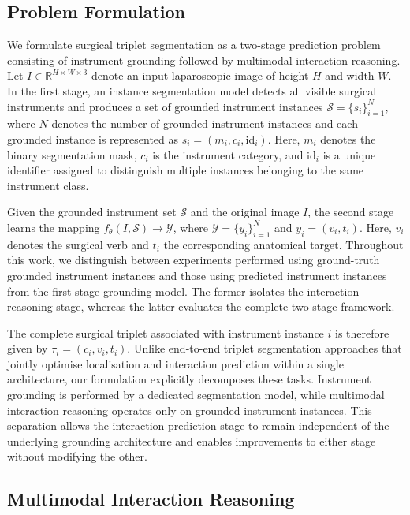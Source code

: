 \documentclass[11pt]{article}
\begin{document}
\subsection{Problem Formulation} \label{sec:problem_formulation}
We formulate surgical triplet segmentation as a two-stage prediction problem consisting of instrument grounding followed by multimodal interaction reasoning. Let $ I \in \mathbb{R}^{H \times W \times 3}$ denote an input laparoscopic image of height $H$ and width $W$. In the first stage, an instance segmentation model detects all visible surgical instruments and produces a set of grounded instrument instances $\mathcal{S} = \{s_i\}_{i=1}^{N},$ where $N$ denotes the number of grounded instrument instances and each grounded instance is represented as $s_i=(m_i,c_i,\mathrm{id}_i).$ Here, $m_i$ denotes the binary segmentation mask, $c_i$ is the instrument category, and $\mathrm{id}_i$ is a unique identifier assigned to distinguish multiple instances belonging to the same instrument class.

Given the grounded instrument set $\mathcal{S}$ and the original image $I$, the
second stage learns the mapping $f_{\theta}(I,\mathcal{S}) \rightarrow \mathcal{Y}$,
where $\mathcal{Y}=\{y_i\}_{i=1}^{N}$ and $y_i=(v_i,t_i)$.
Here, $v_i$ denotes the surgical verb and $t_i$ the corresponding anatomical
target. Throughout this work, we distinguish between experiments performed using ground-truth grounded instrument instances and those using predicted instrument instances from the first-stage grounding model. The former isolates the interaction reasoning stage, whereas the latter evaluates the complete two-stage framework.

The complete surgical triplet associated with instrument instance $i$ is therefore given by $\tau_i=(c_i,v_i,t_i).$ Unlike end-to-end triplet segmentation approaches that jointly optimise localisation and interaction prediction within a single architecture, our formulation explicitly decomposes these tasks. Instrument grounding is performed by a dedicated segmentation model, while multimodal interaction reasoning operates only on grounded instrument instances. This separation allows the interaction prediction stage to remain independent of the underlying grounding architecture and enables improvements to either stage without modifying the other.

\subsection{Multimodal Interaction Reasoning} \label{sec:multimodal_interaction_reasoning}
\end{document}

